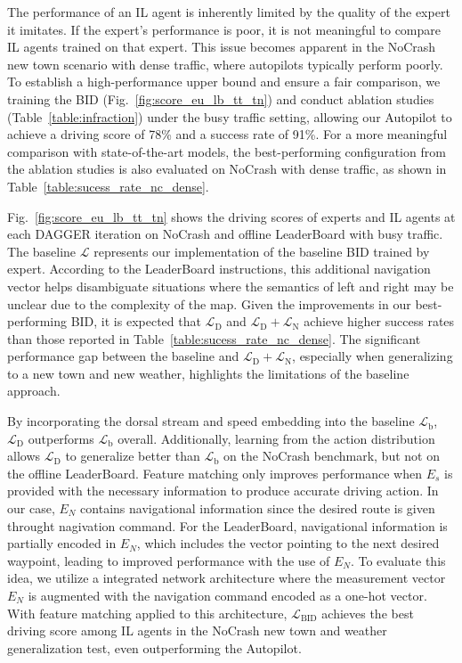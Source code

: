 \hspace{1pc}The performance of an IL agent is inherently limited by the quality of the expert it imitates. 
If the expert's performance is poor, it is not meaningful to compare IL agents trained on that expert. 
This issue becomes apparent in the NoCrash new town scenario with dense traffic, where autopilots typically perform poorly. 
To establish a high-performance upper bound and ensure a fair comparison, we training the BID (Fig.~\ref{fig:score_eu_lb_tt_tn}) and conduct ablation studies (Table~\ref{table:infraction}) under the busy traffic setting, allowing our Autopilot to achieve a driving score of 78\% and a success rate of 91\%. 
For a more meaningful comparison with state-of-the-art models, the best-performing configuration from the ablation studies is also evaluated on NoCrash with dense traffic, as shown in Table~\ref{table:sucess_rate_nc_dense}.


Fig.~\ref{fig:score_eu_lb_tt_tn} shows the driving scores of experts and IL agents at each DAGGER iteration on NoCrash and offline LeaderBoard with busy traffic.
The baseline $\mathcal{L}$ represents our implementation of the baseline BID trained by expert. 
According to the LeaderBoard instructions, this additional navigation vector helps disambiguate situations where the semantics of left and right may be unclear due to the complexity of the map.
Given the improvements in our best-performing BID, it is expected that $\mathcal{L}_\text{D}$ and $\mathcal{L}_\text{D} + \mathcal{L}_\text{N}$ achieve higher success rates than those reported in Table~\ref{table:sucess_rate_nc_dense}.
The significant performance gap between the baseline and $\mathcal{L}_\text{D} + \mathcal{L}_\text{N}$, especially when generalizing to a new town and new weather, highlights the limitations of the baseline approach.


By incorporating the dorsal stream and speed embedding into the baseline $\mathcal{L}_\text{b}$, $\mathcal{L}_\text{D}$ outperforms $\mathcal{L}_\text{b}$ overall.
Additionally, learning from the action distribution allows $\mathcal{L}_\text{D}$ to generalize better than $\mathcal{L}_\text{b}$ on the NoCrash benchmark, but not on the offline LeaderBoard.
Feature matching only improves performance when $E_s$ is provided with the necessary information to produce accurate driving action.
In our case, $E_N$ contains navigational information since the desired route is given throught nagivation command.
For the LeaderBoard, navigational information is partially encoded in $E_N$, which includes the vector pointing to the next desired waypoint, leading to improved performance with the use of $E_N$.
To evaluate this idea, we utilize a integrated network architecture where the measurement vector $E_N$ is augmented with the navigation command encoded as a one-hot vector.
With feature matching applied to this architecture, $\mathcal{L}_\text{BID}$ achieves the best driving score among IL agents in the NoCrash new town and weather generalization test, even outperforming the Autopilot.



